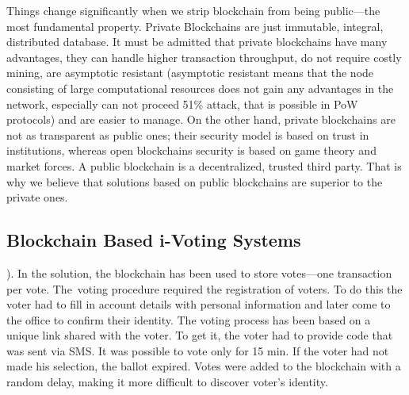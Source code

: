\documentclass[applsci,article,accept,moreauthors,pdftex]{Definitions/mdpi}
\begin{document}
Things change significantly when we strip blockchain from being public––the most fundamental property. Private Blockchains are just immutable, integral, distributed database. It must be admitted that private blockchains have many advantages, they can handle higher transaction throughput, do not require costly mining, are asymptotic resistant (asymptotic resistant means that the node consisting of large computational resources does not gain any advantages in the network, especially can not proceed 51\% attack, that is possible in PoW %
	protocols) and are easier to manage. On the other hand, private blockchains are not as transparent as public ones; their security model is based on trust in institutions, whereas open blockchains security is based on game theory and market forces. A public blockchain is a decentralized, trusted third party. That is why we believe that solutions based on public blockchains are superior to the private ones.


\subsection{Blockchain Based i-Voting Systems}
\label{related-work}
).
In the solution, the blockchain has been used to store votes---one transaction per vote.
The~voting procedure required the registration of voters. To do this
the voter had to fill in account details with personal information
and later come to the office to confirm their identity.
The voting process has been based on a unique link shared with the voter. To get it, the voter had to provide code that was sent via SMS. It was possible to vote only for 15 min. If the voter had not made his selection, the ballot expired. Votes were added to the blockchain with a random delay, making it more difficult to discover voter's identity.
\end{document}
